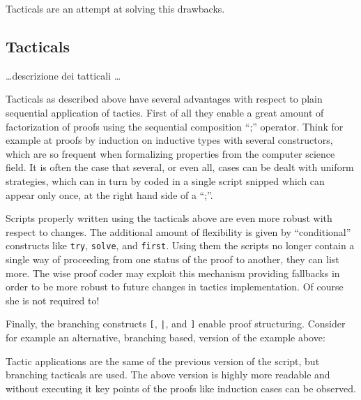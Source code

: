 Tacticals are an attempt at solving this drawbacks.

\subsection{Tacticals}


\ldots descrizione dei tatticali \ldots


Tacticals as described above have several advantages with respect to plain
sequential application of tactics. First of all they enable a great amount of
factorization of proofs using the sequential composition ``;'' operator. Think
for example at proofs by induction on inductive types with several constructors,
which are so frequent when formalizing properties from the computer science
field. It is often the case that several, or even all, cases can be dealt with
uniform strategies, which can in turn by coded in a single script snipped which
can appear only once, at the right hand side of a ``;''.


Scripts properly written using the tacticals above are even more robust with
respect to changes. The additional amount of flexibility is given by
``conditional'' constructs like \texttt{try}, \texttt{solve}, and
\texttt{first}. Using them the scripts no longer contain a single way of
proceeding from one status of the proof to another, they can list more. The wise
proof coder may exploit this mechanism providing fallbacks in order to be more
robust to future changes in tactics implementation. Of course she is not
required to!


Finally, the branching constructs \texttt{[}, \texttt{|}, and \texttt{]} enable
proof structuring. Consider for example an alternative, branching based, version
of the example above:


Tactic applications are the same of the previous version of the script, but
branching tacticals are used. The above version is highly more readable and
without executing it key points of the proofs like induction cases can be
observed.


